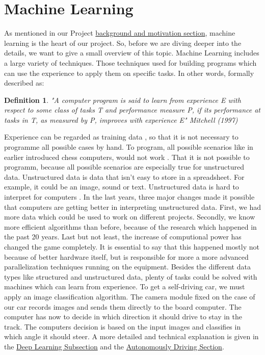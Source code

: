 \documentclass[journal]{IEEEtran}
\newtheorem{definition}{Definition}
\begin{document}
\section{Machine Learning}
As mentioned in our Project \hyperref[sec:backgroundMotivation]{background and motivation section}, machine learning is the heart of our project. So, before we are diving deeper into the details, we want to give a small overview of this topic. Machine Learning includes a large variety of techniques. Those techniques used for building programs which can use the experience to apply them on specific tasks. In other words, formally described as: \\
\begin{definition}
\noindent"A computer program is said to learn from experience E with respect to some class of tasks T and performance measure P, if its performance at tasks in T, as measured by P, improves with experience E"\- Mitchell (1997)  \\
\end{definition}
Experience can be regarded as training data \cite{wang_2003}, so that it is not necessary to programme all possible cases by hand. To program, all possible scenarios like in earlier introduced chess computers, would not work \cite{Goodfellow-et-al-2016}. That it is not possible to programm, because all possible scenarios are especially true for unstructured data. Unstructured data is data that isn't easy to store in a spreadsheet. For example, it could be an image, sound or text. Unstructured data is hard to interpret for computers \cite{Goodfellow-et-al-2016}\cite{LeCun1998}. In the last years, three major changes made it possible that computers are getting better in interpreting unstructured data. First, we had more data which could be used to work on different projects. Secondly, we know more efficient algorithms than before, because of the research which happened in the past 20 years.
Last but not least, the increase of computional power has changed the game completely. It is essential to say that this happened mostly not because of better hardware itself, but is responsible for more a more advanced parallelization techniques running on the equipment. Besides the different data types like structured and unstructured data, plenty of tasks could be solved with machines which can learn from experience. To get a self-driving car, we must apply an image classification algorithm. The camera module fixed on the case of our car records images and sends them directly to the board computer. The computer has now to decide in which direction it should drive to stay in the track. The computers decision is based on the 
input images and classifies in which angle it should steer. A more detailed and technical explanation is given in the \hyperref[subsec:deeplearning]{Deep Learning Subsection} and the \hyperref[sec:AutonomouslyDriving]{Autonomously Driving Section}.
\end{document}

